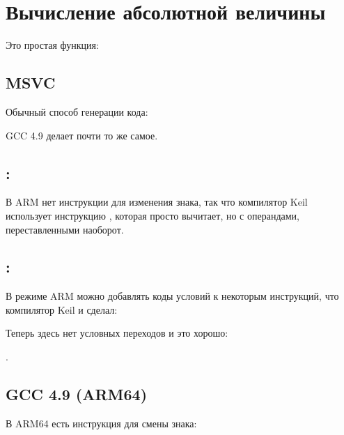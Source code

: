 \section{Вычисление абсолютной величины}
\label{sec:abs}

Это простая функция:



\subsection{\Optimizing MSVC}

Обычный способ генерации кода:



\ifdefined\IncludeGCC
GCC 4.9 делает почти то же самое.

\fi

\ifdefined\IncludeARM
\subsection{\OptimizingKeilVI: \ThumbMode}



В ARM нет инструкции для изменения знака, так что компилятор Keil использует инструкцию ,
которая просто вычитает, но с операндами, переставленными наоборот.

\subsection{\OptimizingKeilVI: \ARMMode}

В режиме ARM можно добавлять коды условий к некоторым инструкций, что компилятор Keil и сделал:



Теперь здесь нет условных переходов и это хорошо:
 
.

\subsection{\NonOptimizing GCC 4.9 (ARM64)}

В ARM64 есть инструкция  для смены знака:

